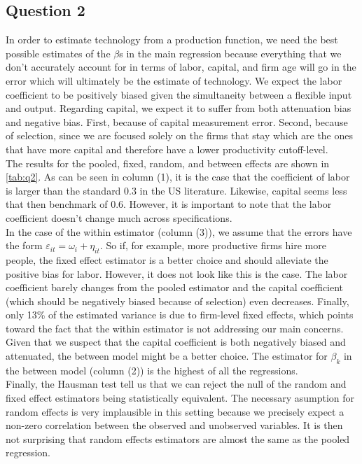 \documentclass[11pt]{article}
\begin{document}
\subsection*{Question 2} \label{q2}
In order to estimate technology from a production function, we need the best possible estimates of the $\beta$s in the main regression because everything that we don't accurately account for in terms of labor, capital, and firm age will go in the error which will ultimately be the estimate of technology. We expect the labor coefficient to be positively biased given the simultaneity between a flexible input and output. Regarding capital, we expect it to suffer from both attenuation bias and negative bias. First, because of capital measurement error. Second, because of selection, since we are focused solely on the firms that stay which are the ones that have more capital and therefore have a lower productivity cutoff-level.\\

The results for the pooled, fixed, random, and between effects are shown in \autoref{tab:q2}. As can be seen in column (1), it is the case that the coefficient of labor is larger than the standard 0.3 in the US literature. Likewise, capital seems less that then benchmark of 0.6. However, it is important to note that the labor coefficient doesn't change much across specifications. \\

In the case of the within estimator (column (3)), we assume that the errors have the form $\varepsilon_{it}=\omega_i+\eta_{it}$. So if, for example, more productive firms hire more people, the fixed effect estimator is a better choice and should alleviate the positive bias for labor. However, it does not look like this is the case. The labor coefficient barely changes from the pooled estimator and the capital coefficient (which should be negatively biased because of selection) even decreases. Finally, only 13\% of the estimated variance is due to firm-level fixed effects, which points toward the fact that the within estimator is not addressing our main concerns. \\

Given that we suspect that the capital coefficient is both negatively biased and attenuated, the between model might be a better choice. The estimator for $\beta_k$ in the between model (column (2)) is the highest of all the regressions. \\

Finally, the Hausman test tell us that we can reject the null of the random and fixed effect estimators being statistically equivalent. The necessary asumption for random effects is very implausible in this setting because we precisely expect a non-zero correlation between the observed and unobserved variables. It is then not surprising that random effects estimators are almost the same as the pooled regression.
\end{document}
